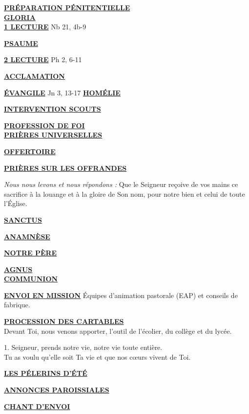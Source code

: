 \documentclass[french,11pt]{article}
\newcommand*{\chants}{../chants}
\newcommand*{\messe}{../messe_grace}
\newcommand*{\pu}{../pu}
\newcommand*{\psaumes}{../psaumes}
\newcommand{\NewsItem}[1]{%
\vspace{3pt}
\underline{\textbf{#1}}
		  }
\begin{document}
\NewsItem{PRÉPARATION PÉNITENTIELLE}\\
	

\NewsItem{GLORIA}\\
	


\NewsItem{1\iere{} LECTURE} Nb 21, 4b-9

\NewsItem{PSAUME}


\NewsItem{2\ieme{} LECTURE} Ph 2, 6-11

\NewsItem{ACCLAMATION}


\NewsItem{ÉVANGILE} Jn 3, 13-17
\hfill
\NewsItem{HOMÉLIE}
\hfill
\NewsItem{INTERVENTION SCOUTS}

\NewsItem{PROFESSION DE FOI}\\



\NewsItem{PRIÈRES UNIVERSELLES}


\NewsItem{OFFERTOIRE}

\NewsItem{PRIÈRES SUR LES OFFRANDES}
\textit{Nous nous levons et nous répondons : }
Que le Seigneur reçoive de vos mains ce sacrifice à la louange et à la gloire
de Son nom, pour notre bien et celui de toute l’Église.

\NewsItem{SANCTUS}


\NewsItem{ANAMNÈSE}


\NewsItem{NOTRE PÈRE}

\NewsItem{AGNUS} \\


\NewsItem{COMMUNION}


\NewsItem{ENVOI EN MISSION} Équipes d'animation pastorale (EAP) et conseils de fabrique.

\NewsItem{PROCESSION DES CARTABLES}\\
Devant Toi, nous venons apporter, l’outil de l’écolier, du collège et du lycée.

1.  Seigneur, prends notre vie, notre vie toute entière. \\
     Tu as voulu qu’elle soit Ta vie et que nos cœurs vivent de Toi. 

\NewsItem{LES PÉLERINS D'ÉTÉ}
\hfill
\NewsItem{ANNONCES PAROISSIALES}

\newpage

\NewsItem{CHANT D'ENVOI}

\end{document}
